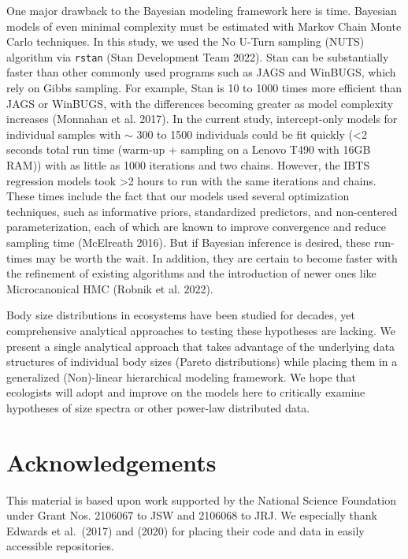 \documentclass[
  12pt,
]{article}
\numberwithin{equation}
\begin{document}
One major drawback to the Bayesian modeling framework here is time.
Bayesian models of even minimal complexity must be estimated with Markov
Chain Monte Carlo techniques. In this study, we used the No U-Turn
sampling (NUTS) algorithm via \texttt{rstan} (Stan Development Team
2022). Stan can be substantially faster than other commonly used
programs such as JAGS and WinBUGS, which rely on Gibbs sampling. For
example, Stan is 10 to 1000 times more efficient than JAGS or WinBUGS,
with the differences becoming greater as model complexity increases
(Monnahan et al. 2017). In the current study, intercept-only models for
individual samples with \(\sim\) 300 to 1500 individuals could be fit
quickly (\textless2 seconds total run time (warm-up + sampling on a
Lenovo T490 with 16GB RAM)) with as little as 1000 iterations and two
chains. However, the IBTS regression models took \textgreater2 hours to
run with the same iterations and chains. These times include the fact
that our models used several optimization techniques, such as
informative priors, standardized predictors, and non-centered
parameterization, each of which are known to improve convergence and
reduce sampling time (McElreath 2016). But if Bayesian inference is
desired, these run-times may be worth the wait. In addition, they are
certain to become faster with the refinement of existing algorithms and
the introduction of newer ones like Microcanonical HMC (Robnik et al.
2022).

Body size distributions in ecosystems have been studied for decades, yet
comprehensive analytical approaches to testing these hypotheses are
lacking. We present a single analytical approach that takes advantage of
the underlying data structures of individual body sizes (Pareto
distributions) while placing them in a generalized (Non)-linear
hierarchical modeling framework. We hope that ecologists will adopt and
improve on the models here to critically examine hypotheses of size
spectra or other power-law distributed data.

\hypertarget{acknowledgements}{%
\section{Acknowledgements}\label{acknowledgements}}

This material is based upon work supported by the National Science
Foundation under Grant Nos. 2106067 to JSW and 2106068 to JRJ. We
especially thank Edwards et al.~(2017) and (2020) for placing their code
and data in easily accessible repositories.
\end{document}
